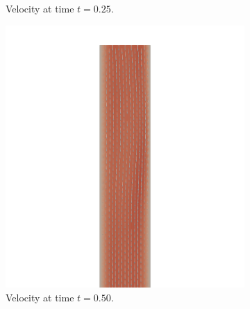 \documentclass[a4paper,11pt,openright,twoside]{book}
\begin{document}
\begin{figure}[h!]
\begin{subfigure}[b]{0.5\linewidth}
        \centering 
    \caption{Velocity at time $t = 0.25$.} 
    \label{fig3:b} 
    \vspace{4ex}
  \end{subfigure} 
  \begin{subfigure}[b]{0.5\linewidth}
    \centering
    \includegraphics[width=1.2\linewidth]{images/velocity_50_050.png} 
        \centering
    \caption{Velocity at time $t = 0.50$.} 
    \label{fig3:c} 
  \end{subfigure}%
  \begin{subfigure}[b]{0.5\linewidth}
    \centering

\end{subfigure}
\end{figure}
\end{document}
